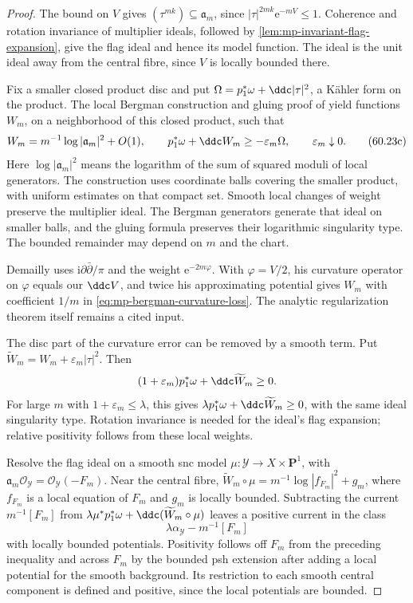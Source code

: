 \begin{proof}
The bound on $V$ gives $(\tau^{mk})\subseteq\mathfrak a_m$, since $|\tau|^{2mk}\mathrm e^{-mV}\leq1$. Coherence and rotation invariance of multiplier ideals, followed by \cref{lem:mp-invariant-flag-expansion}, give the flag ideal and hence its model function. The ideal is the unit ideal away from the central fibre, since $V$ is locally bounded there.

Fix a smaller closed product disc and put $\Omega=p_1^*\omega+\ddc|\tau|^2$, a K\"ahler form on the product. The local Bergman construction and gluing proof of \cite[Proposition~3.7, with Proposition~3.1 and Lemmas~3.5--3.6]{Dem92reg} yield functions $W_m$, on a neighborhood of this closed product, such that
\[
 W_m=m^{-1}\log|\mathfrak a_m|^2+O(1),\qquad
 p_1^*\omega+\ddc W_m\geq-\varepsilon_m\Omega,
 \qquad\varepsilon_m\downarrow0.
\tag{60.23c}\label{eq:mp-bergman-curvature-loss}
\]
Here $\log|\mathfrak a_m|^2$ means the logarithm of the sum of squared moduli of local generators. The construction uses coordinate balls covering the smaller product, with uniform estimates on that compact set. Smooth local changes of weight preserve the multiplier ideal. The Bergman generators generate that ideal on smaller balls, and the gluing formula preserves their logarithmic singularity type. The bounded remainder may depend on $m$ and the chart.

Demailly uses $\mathrm{i}\partial\bar\partial/\pi$ and the weight $\mathrm e^{-2m\varphi}$. With $\varphi=V/2$, his curvature operator on $\varphi$ equals our $\ddc V$, and twice his approximating potential gives $W_m$ with coefficient $1/m$ in \eqref{eq:mp-bergman-curvature-loss}. The analytic regularization theorem itself remains a cited input.

The disc part of the curvature error can be removed by a smooth term. Put $\widetilde W_m=W_m+\varepsilon_m|\tau|^2$. Then
\[
 (1+\varepsilon_m)p_1^*\omega+\ddc\widetilde W_m\geq0.
\]
For large $m$ with $1+\varepsilon_m\leq\lambda$, this gives $\lambda p_1^*\omega+\ddc\widetilde W_m\geq0$, with the same ideal singularity type. Rotation invariance is needed for the ideal's flag expansion; relative positivity follows from these local weights.

Resolve the flag ideal on a smooth snc model $\mu:\mathcal Y\to X\times\mathbf P^1$, with $\mathfrak a_m\mathcal O_{\mathcal Y}=\mathcal O_{\mathcal Y}(-F_m)$. Near the central fibre, $\widetilde W_m\circ\mu=m^{-1}\log|f_{F_m}|^2+g_m$, where $f_{F_m}$ is a local equation of $F_m$ and $g_m$ is locally bounded. Subtracting the current $m^{-1}[F_m]$ from $\lambda\mu^*p_1^*\omega+\ddc(\widetilde W_m\circ\mu)$ leaves a positive current in the class
\[
                   \lambda\alpha_{\mathcal Y}-m^{-1}[F_m]
\]
with locally bounded potentials. Positivity follows off $F_m$ from the preceding inequality and across $F_m$ by the bounded psh extension after adding a local potential for the smooth background. Its restriction to each smooth central component is defined and positive, since the local potentials are bounded.


\end{proof}
